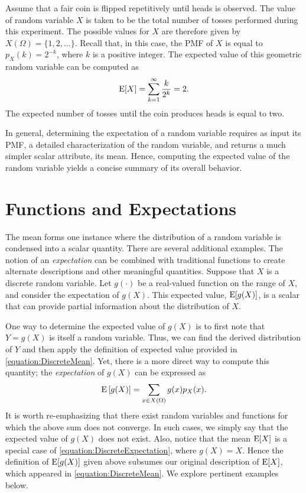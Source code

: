 \begin{example}
Assume that a fair coin is flipped repetitively until heads is observed.
The value of random variable $X$ is taken to be the total number of tosses performed during this experiment.
The possible values for $X$ are therefore given by $X (\Omega) = \{ 1, 2, \ldots \}$.
Recall that, in this case, the PMF of $X$ is equal to $p_X(k) = 2^{-k}$, where $k$ is a positive integer.
The expected value of this geometric random variable can be computed as
\begin{equation*}
\mathrm{E} [X] = \sum_{k=1}^{\infty} \frac{k}{2^k}
= 2.
\end{equation*}
The expected number of tosses until the coin produces heads is equal to two.
\end{example}

In general, determining the expectation of a random variable requires as input its PMF, a detailed characterization of the random variable, and returns a much simpler scalar attribute, its mean.
Hence, computing the expected value of the random variable yields a concise summary of its overall behavior.


\section{Functions and Expectations}

The mean forms one instance where the distribution of a random variable is condensed into a scalar quantity.
There are several additional examples.
The notion of an \emph{expectation} can be combined with traditional functions to create alternate descriptions and other meaningful quantities. 
Suppose that $X$ is a discrete random variable.
Let $g(\cdot)$ be a real-valued function on the range of $X$, and consider the expectation of $g(X)$.
This expected value, $\mathrm{E} [g(X)]$, is a scalar that can provide partial information about the distribution of $X$.

One way to determine the expected value of $g(X)$ is to first note that $Y = g(X)$ is itself a random variable.
Thus, we can find the derived distribution of $Y$ and then apply the definition of expected value provided in \eqref{equation:DiscreteMean}.
Yet, there is a more direct way to compute this quantity;
the \emph{expectation} of $g(X)$ can be expressed as 
\begin{equation} \label{equation:DiscreteExpectation}
\mathrm{E} \left[ g(X) \right]
= \sum_{x \in X(\Omega)} g(x) p_X (x) .
\end{equation}
It is worth re-emphasizing that there exist random variables and functions for which the above sum does not converge.
In such cases, we simply say that the expected value of $g(X)$ does not exist.
Also, notice that the mean $\mathrm{E} [X]$ is a special case of \eqref{equation:DiscreteExpectation}, where $g(X) = X$.
Hence the definition of $\mathrm{E} [g(X)]$ given above subsumes our original description of $\mathrm{E} [X]$, which appeared in \eqref{equation:DiscreteMean}.
We explore pertinent examples below.

